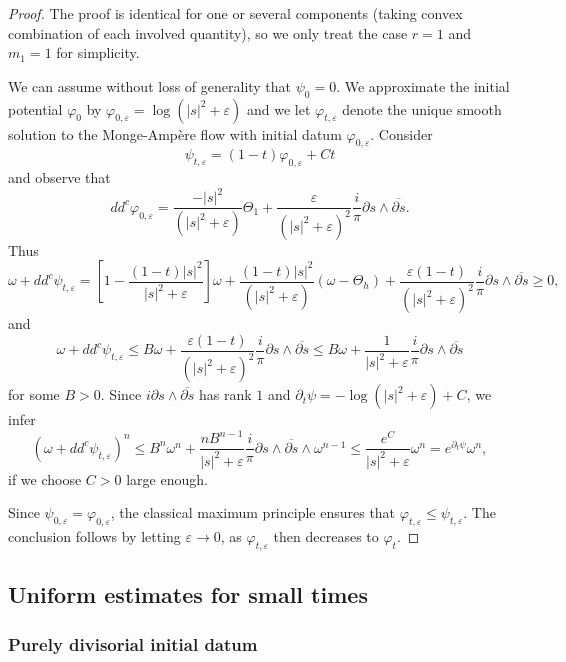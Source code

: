 \documentclass[11pt]{amsart}
\numberwithin{equation}{section}
\newcommand{\f}{\varphi}
\newcommand{\p}{\psi}
\newcommand \e {\varepsilon}
\begin{document}
\begin{proof}
The proof is identical for one or several components (taking convex combination of each involved quantity), 
so we only treat the case $r=1$ and $m_1=1$ for simplicity.


We can assume without loss of generality that $\p_0=0$.
We approximate the initial potential $\varphi_0$ by $\varphi_{0,\varepsilon}= \log (|s|^2+\varepsilon)$ and we let $\varphi_{t,\varepsilon}$ denote the unique smooth solution to the Monge-Amp\`ere flow with initial datum 	$\varphi_{0,\varepsilon}$. 
Consider
$$
\p_{t,\e}=(1-t) \varphi_{0,\varepsilon} +C t
$$
and observe that 
$$
dd^c \varphi_{0,\varepsilon} 
 = \frac{-|s|^2}{(|s|^2+\varepsilon)} \Theta_1
 + \frac{\varepsilon }{(|s|^2+\varepsilon)^2}\frac{ i}{\pi} \partial s \wedge \overline{\partial s}. 
$$
Thus
$$
\omega+dd^c \p_{t,\e}=\left[ 1-\frac{(1-t) |s|^2}{|s|^2+\varepsilon} \right] \omega
+\frac{(1-t)|s|^2}{(|s|^2+\varepsilon)} (\omega-\Theta_h)
+ \frac{\varepsilon (1-t)}{(|s|^2+\varepsilon)^2} \frac{ i}{\pi}  \partial s \wedge \overline{\partial s} \geq 0,
$$
and 
$$
\omega+dd^c \p_{t,\e} \leq B \omega+ \frac{\varepsilon (1-t)}{(|s|^2+\varepsilon)^2} \frac{ i}{\pi}  \partial s \wedge \overline{\partial s}
\leq B \omega+ \frac{1}{|s|^2+\varepsilon} \frac{ i}{\pi}  \partial s \wedge \overline{\partial s}
$$
for some $B>0$.
Since $i \partial s \wedge \overline{\partial s}$ has rank $1$ and
 $\partial_t \p=-\log (|s|^2+\varepsilon) +C$, we infer
$$
(\omega+dd^c \p_{t,\e})^n \leq B^n \omega^n+ \frac{nB^{n-1}}{|s|^2+\varepsilon} \frac{ i}{\pi}  \partial s \wedge \overline{\partial s} \wedge \omega^{n-1}
\leq  \frac{e^C}{|s|^2+\varepsilon}  \omega^{n}=e^{\partial_t \p} \omega^n,
$$
if we choose $C>0$ large enough.

Since $\p_{0,\e}=\f_{0,\e}$, the classical maximum principle ensures that $\f_{t,\e} \leq \p_{t,\e}$.
The conclusion follows by letting $\e \rightarrow 0$, as $\f_{t,\e}$ then decreases  to $\f_t$.
\end{proof}


  

 





\subsection{Uniform estimates for small times}

\subsubsection{Purely divisorial initial datum}
\end{document}
